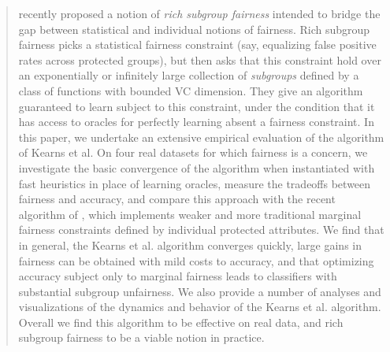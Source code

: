 \documentclass[9pt]{article}
\theoremstyle{definition}
\begin{document}
\begin{abstract}
  \cite{KNRW18} recently proposed a notion of \emph{rich subgroup
    fairness} intended to bridge the gap between statistical and
  individual notions of fairness. Rich subgroup fairness picks a
  statistical fairness constraint (say, equalizing false positive
  rates across protected groups), but then asks that this constraint
  hold over an exponentially or infinitely large collection of
  \emph{subgroups} defined by a class of functions with bounded VC
  dimension.  They give an algorithm guaranteed to learn subject to
  this constraint, under the condition that it has access to oracles
  for perfectly learning absent a fairness constraint. In this paper,
  we undertake an extensive empirical evaluation of the algorithm of
  Kearns et al.  On four real datasets for which fairness is a
  concern, we investigate the basic convergence of the algorithm when
  instantiated with fast heuristics in place of learning oracles,
  measure the tradeoffs between fairness and accuracy, and compare
  this approach with the recent algorithm of \cite{MSR}, which
  implements weaker and more traditional marginal fairness constraints
  defined by individual protected attributes. We find that in general,
  the Kearns et al.  algorithm converges quickly, large gains in
  fairness can be obtained with mild costs to accuracy, and that
  optimizing accuracy subject only to marginal fairness leads to
  classifiers with substantial subgroup unfairness.  We also provide a
  number of analyses and visualizations of the dynamics and behavior
  of the Kearns et al. algorithm.  Overall we find this algorithm to
  be effective on real data, and rich subgroup fairness to be a viable
  notion in practice.
\end{abstract}










 

 \clearpage
 \newpage

 \appendix
 

%
% 
% 

% 


\end{document}
